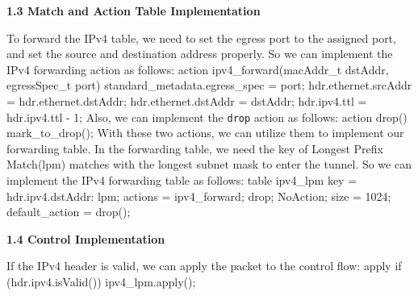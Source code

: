 \documentclass{article}%
\newenvironment{code}%
   {\snugshade\verbatim}%
   {\endverbatim\endsnugshade}
\begin{document}
\begin{Large}
\begin{flushleft}
\begin{LARGE}
\textbf{1.3 Match and Action Table Implementation}
\end{LARGE}
\end{flushleft}
To forward the IPv4 table, we need to set the egress port to the assigned port, and set the source and destination address properly. So we can implement the IPv4 forwarding action as follows:
\begin{code}
    action ipv4_forward(macAddr_t dstAddr, egressSpec_t port) {
        standard_metadata.egress_spec = port;
        hdr.ethernet.srcAddr = hdr.ethernet.dstAddr;
        hdr.ethernet.dstAddr = dstAddr;
        hdr.ipv4.ttl = hdr.ipv4.ttl - 1;
    }
\end{code}
Also, we can implement the \texttt{drop} action as follows:
\begin{code}
    action drop() {
        mark_to_drop();
    }
\end{code}
With these two actions, we can utilize them to implement our forwarding table. In the forwarding table, we need the key of Longest Prefix Match(lpm) matches with the longest subnet mask to enter the tunnel. So we can implement the IPv4 forwarding table as follows:
\newpage
\begin{code}
    table ipv4_lpm {
        key = {
            hdr.ipv4.dstAddr: lpm;
        }
        actions = {
            ipv4_forward;
            drop;
            NoAction;
        }
        size = 1024;
        default_action = drop();
    }
\end{code}

\begin{flushleft}
\begin{LARGE}
\textbf{1.4 Control Implementation}
\end{LARGE}
\end{flushleft}
If the IPv4 header is valid, we can apply the packet to the control flow:
\begin{code}
    apply {
        if (hdr.ipv4.isValid()) {
            ipv4_lpm.apply();
        }
    }
\end{code}


\end{Large}
\end{document}

